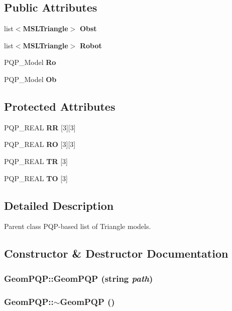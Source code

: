 \subsection*{Public Attributes}
\begin{CompactItemize}
\item 
list$<${\bf MSLTriangle}$>$ {\bf Obst}
\item 
list$<${\bf MSLTriangle}$>$ {\bf Robot}
\item 
PQP\_\-Model {\bf Ro}
\item 
PQP\_\-Model {\bf Ob}
\end{CompactItemize}
\subsection*{Protected Attributes}
\begin{CompactItemize}
\item 
PQP\_\-REAL {\bf RR} [3][3]
\item 
PQP\_\-REAL {\bf RO} [3][3]
\item 
PQP\_\-REAL {\bf TR} [3]
\item 
PQP\_\-REAL {\bf TO} [3]
\end{CompactItemize}


\subsection{Detailed Description}
Parent class PQP-based list of Triangle models.



\subsection{Constructor \& Destructor Documentation}
\subsubsection{\setlength{\rightskip}{0pt plus 5cm}Geom\-PQP::Geom\-PQP (string {\em path})}\label{class_GeomPQP_a0}


\subsubsection{\setlength{\rightskip}{0pt plus 5cm}Geom\-PQP::$\sim$Geom\-PQP ()\hspace{0.3cm}{\tt  [inline, virtual]}}\label{class_GeomPQP_a1}




